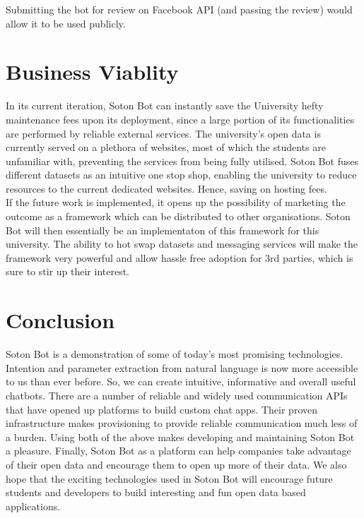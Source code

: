\documentclass[journal, a4paper]{IEEEtran}
\begin{document}
Submitting the bot for review on Facebook API (and passing the review) would allow it to be used publicly.

\section{Business Viablity}

In its current iteration, Soton Bot can instantly save the University hefty maintenance fees upon its deployment, since a large portion of its functionalities are performed by reliable external services. The university's open data is currently served on a plethora of websites, most of which the students are unfamiliar with, preventing the services from being fully utilised. Soton Bot fuses different datasets as an intuitive one stop shop, enabling the university to reduce resources to the current dedicated websites. Hence, saving on hosting fees.\\     

If the future work is implemented, it opens up the possibility of marketing the outcome as a framework which can be distributed to other  organisations. Soton Bot will then essentially be an implementaton of this framework for this university. The ability to hot swap datasets and messaging services will make the framework very powerful and allow hassle free adoption for 3rd parties, which is sure to stir up their interest.  

\section{Conclusion}

Soton Bot is a demonstration of some of today's most promising technologies. Intention and parameter extraction from natural language is now more accessible to us than ever before. So, we can create intuitive, informative and overall useful chatbots. There are a number of reliable and widely used communication APIs that have opened up platforms to build custom chat apps. Their proven infrastructure makes provisioning to provide reliable communication much less of a burden. Using both of the above makes developing and maintaining Soton Bot a pleasure. Finally, Soton Bot as a platform can help companies take advantage of their open data and encourage them to open up more of their data. We also hope that the exciting technologies used in Soton Bot will encourage future students and developers to build interesting and fun open data based applications.
\end{document}
